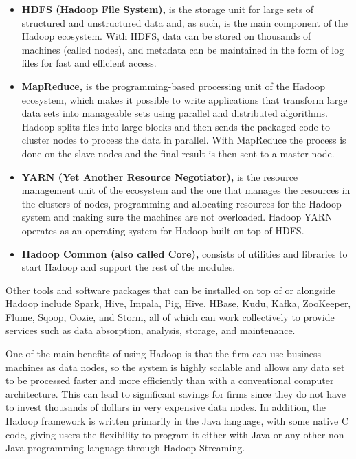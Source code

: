 \documentclass[
  letterpaper,
  DIV=11,
  numbers=noendperiod]{scrreprt}
\begin{document}
\begin{itemize}
\item
  \textbf{HDFS (Hadoop File System),} is the storage unit for large sets
  of structured and unstructured data and, as such, is the main
  component of the Hadoop ecosystem. With HDFS, data can be stored on
  thousands of machines (called nodes), and metadata can be maintained
  in the form of log files for fast and efficient access.
\item
  \textbf{MapReduce,} is the programming-based processing unit of the
  Hadoop ecosystem, which makes it possible to write applications that
  transform large data sets into manageable sets using parallel and
  distributed algorithms. Hadoop splits files into large blocks and then
  sends the packaged code to cluster nodes to process the data in
  parallel. With MapReduce the process is done on the slave nodes and
  the final result is then sent to a master node.
\item
  \textbf{YARN (Yet Another Resource Negotiator),} is the resource
  management unit of the ecosystem and the one that manages the
  resources in the clusters of nodes, programming and allocating
  resources for the Hadoop system and making sure the machines are not
  overloaded. Hadoop YARN operates as an operating system for Hadoop
  built on top of HDFS.
\item
  \textbf{Hadoop Common (also called Core),} consists of utilities and
  libraries to start Hadoop and support the rest of the modules.
\end{itemize}

Other tools and software packages that can be installed on top of or
alongside Hadoop include Spark, Hive, Impala, Pig, Hive, HBase, Kudu,
Kafka, ZooKeeper, Flume, Sqoop, Oozie, and Storm, all of which can work
collectively to provide services such as data absorption, analysis,
storage, and maintenance.

One of the main benefits of using Hadoop is that the firm can use
business machines as data nodes, so the system is highly scalable and
allows any data set to be processed faster and more efficiently than
with a conventional computer architecture. This can lead to significant
savings for firms since they do not have to invest thousands of dollars
in very expensive data nodes. In addition, the Hadoop framework is
written primarily in the Java language, with some native C code, giving
users the flexibility to program it either with Java or any other
non-Java programming language through Hadoop Streaming.
\end{document}
